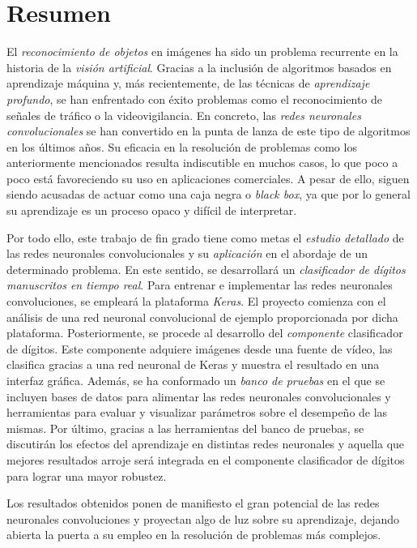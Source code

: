 \chapter*{Resumen}
El \emph{reconocimiento de objetos} en imágenes ha sido un problema recurrente en la historia de la \emph{visión artificial}. Gracias a la inclusión de algoritmos basados en aprendizaje máquina y, más recientemente, de las técnicas de \emph{aprendizaje profundo}, se han enfrentado con éxito problemas como el reconocimiento de señales de tráfico o la videovigilancia. En concreto, las \emph{redes neuronales convolucionales} se han convertido en la punta de lanza de este tipo de algoritmos en los últimos años. Su eficacia en la resolución de problemas como los anteriormente mencionados resulta indiscutible en muchos casos, lo que poco a poco está favoreciendo su uso en aplicaciones comerciales. A pesar de ello, siguen siendo acusadas de actuar como una caja negra o \emph{black box}, ya que por lo general su aprendizaje es un proceso opaco y difícil de interpretar.

Por todo ello, este trabajo de fin grado tiene como metas el \emph{estudio detallado} de las redes neuronales convolucionales y su \emph{aplicación} en el abordaje de un determinado problema. En este sentido, se desarrollará un \emph{clasificador de dígitos manuscritos en tiempo real}. Para entrenar e implementar las redes neuronales convoluciones, se empleará la plataforma \emph{Keras}. El proyecto comienza con el análisis de una red neuronal convolucional de ejemplo proporcionada por dicha plataforma. Posteriormente, se procede al desarrollo del \emph{componente} clasificador de dígitos. Este componente adquiere imágenes desde una fuente de vídeo, las clasifica gracias a una red neuronal de Keras y muestra el resultado en una interfaz gráfica. Además, se ha conformado un \emph{banco de pruebas} en el que se incluyen bases de datos para alimentar las redes neuronales convolucionales y herramientas para evaluar y visualizar parámetros sobre el desempeño de las mismas. Por último, gracias a las herramientas del banco de pruebas, se discutirán los efectos del aprendizaje en distintas redes neuronales y aquella que mejores resultados arroje será integrada en el componente clasificador de dígitos para lograr una mayor robustez.

Los resultados obtenidos ponen de manifiesto el gran potencial de las redes neuronales convoluciones y proyectan algo de luz sobre su aprendizaje, dejando abierta la puerta a su empleo en la resolución de problemas más complejos.